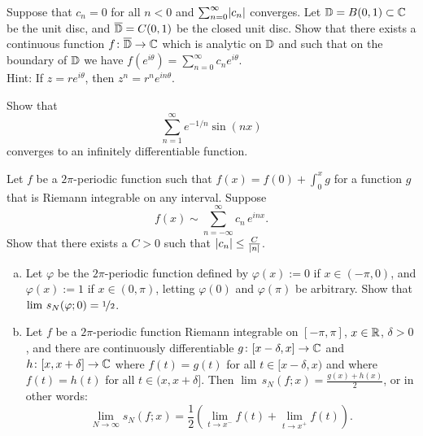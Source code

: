 \begin{exercise}
Suppose that $c_n = 0$ for all $n < 0$ and $\sum_{n=0}^\infty \lvert {c_n} \rvert$
converges.  Let ${\mathbb{D}} = B(0,1) \subset {\mathbb{C}}$ be the unit disc,
and $\overline{{\mathbb{D}}} = C(0,1)$ be the closed unit disc.
Show that there exists a continuous function
$f \colon \overline{{\mathbb{D}}} \to {\mathbb{C}}$ which is analytic on ${\mathbb{D}}$
and such that on the boundary of ${\mathbb{D}}$ we have
$f(e^{i\theta}) = \sum_{n=0}^\infty c_n e^{i\theta}$.\\
Hint: If $z=re^{i\theta}$, then $z^n = r^n e^{in\theta}$.
\end{exercise}

\begin{exercise}
Show that
\begin{equation*}
\sum_{n=1}^\infty e^{-1/n} \sin(n x)
\end{equation*}
converges to an infinitely differentiable function.
\end{exercise}

\begin{exercise}
Let $f$ be a $2\pi$-periodic function
such that $f(x) = f(0) + \int_0^x g$
for a function $g$ that is Riemann integrable on any interval.
Suppose
\begin{equation*}
f(x) \sim
\sum_{n=-\infty}^\infty c_n \,e^{inx} .
\end{equation*}
Show that there exists a $C > 0$ such that
$\lvert {c_n} \rvert \leq \frac{C}{\lvert {n} \rvert}$.
\end{exercise}

\begin{exercise}
\leavevmode
\begin{enumerate}[a)]
\item
Let $\varphi$ be the $2\pi$-periodic function 
defined by $\varphi(x) := 0$ if $x \in (-\pi,0)$,
and $\varphi(x) := 1$ if $x \in (0,\pi)$,
letting $\varphi(0)$ and $\varphi(\pi)$ be arbitrary.  Show
that $\lim \, s_N(\varphi;0) = \nicefrac{1}{2}$.
\item
Let $f$ be a $2\pi$-periodic function
Riemann integrable on $[-\pi,\pi]$, 
$x \in {\mathbb{R}}$, $\delta > 0$, and
there are continuously differentiable
$g \colon [x-\delta,x] \to {\mathbb{C}}$
and $h \colon [x,x+\delta] \to {\mathbb{C}}$
where $f(t) = g(t)$ for all $t \in [x-\delta,x)$
and
where $f(t) = h(t)$ for all $t \in (x,x+\delta]$.
Then
$\lim\, s_N(f;x) = \frac{g(x)+h(x)}{2}$, or in other words:
\begin{equation*}
\lim_{N \to \infty} s_N(f;x) =
\frac{1}{2}
\left(
\lim_{t \to x^-} f(t) +
\lim_{t \to x^+} f(t)
\right) .
\end{equation*}
\end{enumerate}
\end{exercise}
